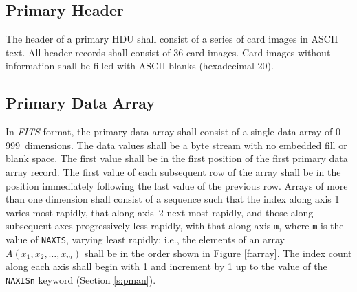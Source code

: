    \subsection{Primary Header}
   The header of a primary HDU shall consist of a 
   series of card images
   in ASCII text.  All header 
   records shall consist of 36 card images.  
   Card images without information 
   shall be filled with ASCII blanks (hexadecimal 20).
  
   \subsection{Primary Data Array}
   In {\em FITS\/} format, the \label{s:pdata}
   primary data array shall consist of a 
   single data array of 0-999~dimensions.  The data values shall be 
   a byte stream with no embedded fill or blank space.  
   The first value shall be in the first position of the first
   primary data array record.  The first value of each subsequent row of the 
   array shall be in the position immediately following the last 
   value of the previous row.  Arrays of more than 
   one
   dimension shall consist of a sequence such that the index along
   axis 1 varies most rapidly, that along axis~2 next most rapidly, and
   those along subsequent axes progressively less rapidly, with that
   along axis {\tt m}, where {\tt m} is the value 
   of {\tt NAXIS},
   varying least rapidly; i.e., the elements of an array
   $A(x_{1}, x_{2}, \ldots, x_{m})$ shall be in the 
   order
   shown in 
   Figure \ref{f:array}.  The index count along each axis shall begin 
   with 1 and increment by 1 up to the value of 
   the {\tt NAXISn} keyword (Section \ref{s:pman}). 
